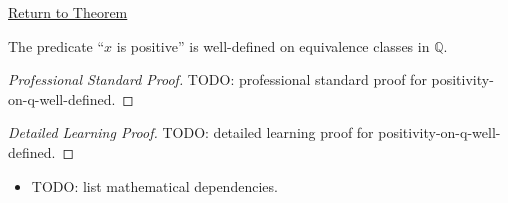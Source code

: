 \newpage
{}
\label{prf:positivity-on-q-well-defined}

\begin{remark*}[Return]
\hyperref[thm:positivity-on-q-well-defined]{Return to Theorem}
\end{remark*}

\begin{theorem*}
The predicate ``$x$ is positive'' is well-defined on equivalence classes in
$\mathbb{Q}$.
\end{theorem*}

\begin{proof}[Professional Standard Proof]
\LRAProofBodyStart
TODO: professional standard proof for positivity-on-q-well-defined.
\end{proof}

\begin{proof}[Detailed Learning Proof]
\LRAProofBodyStart
TODO: detailed learning proof for positivity-on-q-well-defined.
\end{proof}

\begin{remark*}
\end{remark*}

\begin{dependencies}
\begin{itemize}
  \item TODO: list mathematical dependencies.
\end{itemize}
\end{dependencies}

\clearpage
